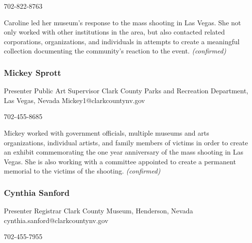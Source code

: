\documentclass{report}
\begin{document}
                702-822-8763\newline

                Caroline led her museum's response to the mass shooting in Las Vegas. She not only worked with other institutions in the area, but also contacted related corporations, organizations, and individuals in attempts to create a meaningful collection documenting the community's reaction to the event.
                \emph{ (confirmed) }
              

              
                \subsubsection*{ Mickey Sprott }
                Presenter\newline
                Public Art Supervisor\newline
                Clark County Parks and Recreation Department, Las Vegas, Nevada
                \newline
                Mickey1@clarkcountynv.gov\newline
                
                702-455-8685\newline

                Mickey worked with government officials, multiple museums and arts organizations, individual artists, and family members of victims in order to create an exhibit commemorating the one year anniversary of the mass shooting in Las Vegas. She is also working with a committee appointed to create a permanent memorial to the victims of the shooting.
                \emph{ (confirmed) }
              

              
                \subsubsection*{ Cynthia Sanford }
                Presenter\newline
                Registrar\newline
                Clark County Museum, Henderson, Nevada
                \newline
                cynthia.sanford@clarkcountynv.gov\newline
                
                702-455-7955\newline
\end{document}
